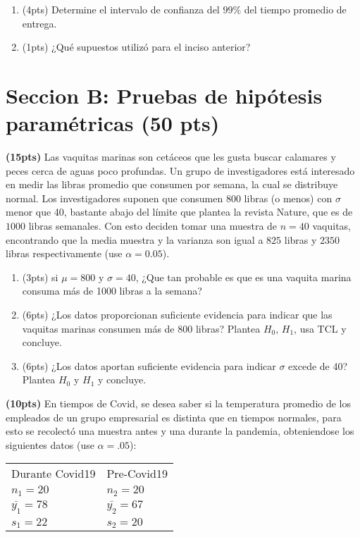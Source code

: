 \documentclass[addpoints]{exam}
\theoremstyle{mytheor}
\begin{document}
\begin{questions}
\begin{enumerate}[label=\Alph*)]
\item (4pts) Determine el intervalo de confianza del $99\%$ del tiempo promedio de entrega.
\item (1pts) ¿Qué supuestos utilizó para el inciso anterior?
\end{enumerate}
  
  

\section*{Seccion B: Pruebas de hipótesis paramétricas (50 pts)}

 \question \textbf{(15pts)} Las vaquitas marinas son cetáceos que les gusta buscar calamares y peces cerca de aguas poco profundas. Un grupo de investigadores está interesado en medir las libras promedio que consumen por semana, la cual se distribuye normal. Los investigadores suponen que consumen $800$ libras (o menos) con $\sigma$ menor que 40, bastante abajo del límite que plantea la revista Nature, que es de $1000$ libras semanales. Con esto deciden tomar una muestra de $n = 40$ vaquitas, encontrando que la media muestra y la varianza son igual a $825$ libras y $2350$ libras respectivamente (use $\alpha = 0.05$).
  
\begin{enumerate}[label=\Alph*)]
  \item  (3pts) si $\mu = 800$ y $\sigma = 40$, ¿Que tan probable es que es una vaquita marina consuma más de 1000 libras a la semana?
  \item (6pts) ¿Los datos proporcionan suficiente evidencia para indicar que las vaquitas marinas consumen más de 800 libras? Plantea $H_0$, $H_1$, usa TCL y concluye.
  \item (6pts) ¿Los datos aportan suficiente evidencia para indicar $\sigma$ excede de 40? Plantea $H_0$ y $H_1$ y concluye.
  \end{enumerate}
  
  \question \textbf{(10pts)} En tiempos de Covid, se desea saber si la temperatura promedio de los empleados de un grupo empresarial es distinta que en tiempos normales, para esto se recolectó una muestra antes y una durante la pandemia, obteniendose los siguientes datos (use $\alpha = .05$):

    \begin{table}[h]
    \centering
    \begin{tabular}{ll}
    Durante Covid19 & Pre-Covid19 \\
    $n_1 = 20$ & $n_2 = 20$ \\
    $\bar{y_1} =  78$ & $\bar{y_2} = 67$ \\
    $s_1 = 22$ &  $s_2 = 20$
    \end{tabular}
    \end{table}


\end{questions}
\end{document}
